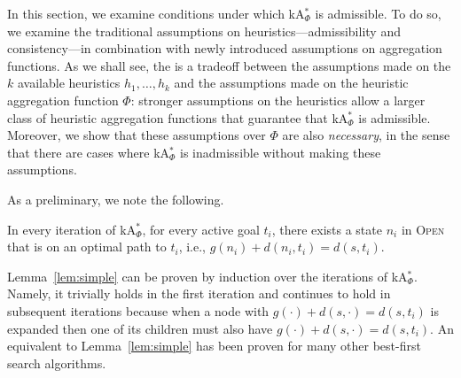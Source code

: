 \documentclass[smallextended]{svjour3}       %
\newcommand{\kastar}{kA$^*$\xspace}
\newcommand{\kastarvar}[1]{\textup{kA}$^*_{#1}$\xspace}
\newcommand{\kastarmin}{\kastarvar{\min}}
\newcommand{\kastarphi}{\textup{kA}$^*_{\Phi}$\xspace}
\newcommand{\open}{\textsc{Open}\xspace}
\newcommand{\abda}[1]{\textbf{[AS:#1]}}
\begin{document}

In this section, we examine conditions under which \kastarphi is admissible.
To do so, we examine the traditional assumptions on heuristics---admissibility and consistency---in combination with newly introduced assumptions on aggregation functions.
As we shall see, the is a tradeoff between the assumptions made on the $k$ available heuristics $h_1,\ldots,h_k$ and the assumptions made on the heuristic aggregation function $\Phi$: stronger assumptions on the heuristics allow a larger class of heuristic aggregation functions that guarantee that \kastarphi is admissible. Moreover, we show that these assumptions over $\Phi$ are also \emph{necessary}, in the sense that there are cases where \kastarphi is inadmissible without making these assumptions.



As a preliminary, we note the following. 
\begin{lemma}
  \label{lem:simple}
  In every iteration of \kastarphi, for every active goal $t_i$, there exists a state $n_i$ in \open that is on an optimal path to $t_i$, i.e., $g(n_i) + d(n_i, t_i) = d(s, t_i)$.
\end{lemma}

Lemma~\ref{lem:simple} can be proven by induction over the iterations of \kastarphi. 
Namely, it trivially holds in the first iteration and continues to hold in subsequent iterations because when a node with $g(\cdot) + d(s,\cdot) = d(s, t_i)$ is expanded then one of its children must also have $g(\cdot) + d(s,\cdot) = d(s, t_i)$.
An equivalent to Lemma~\ref{lem:simple} has been proven for many other best-first search algorithms.
\end{document}
